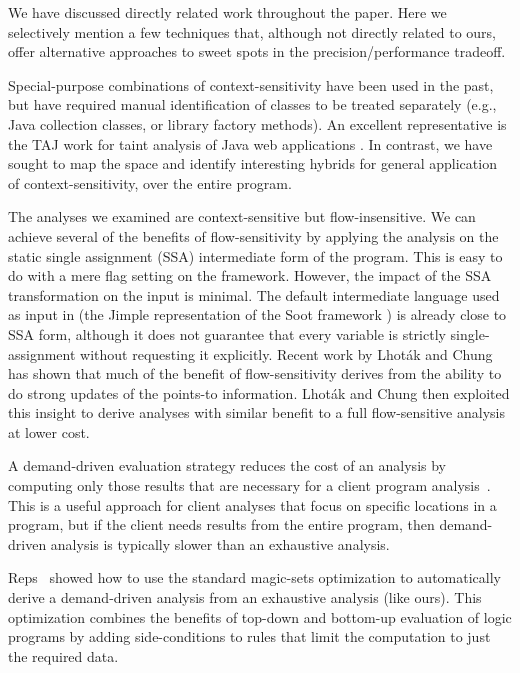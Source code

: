 We have discussed directly related work throughout the paper. Here we
selectively mention a few techniques that, although not directly
related to ours, offer alternative approaches to sweet spots in the
precision/performance tradeoff.

Special-purpose combinations of context-sensitivity have been used in
the past, but have required manual identification of classes to be
treated separately (e.g., Java collection classes, or library factory
methods). An excellent representative is the TAJ work for taint
analysis of Java web applications
\cite{Tripp:2009:TET:1542476.1542486}. In contrast, we have sought to
map the space and identify interesting hybrids for general application
of context-sensitivity, over the entire program.

The analyses we examined are context-sensitive but flow-insensitive.
We can achieve several of the benefits of flow-sensitivity by applying
the analysis on the static single assignment (SSA) intermediate form
of the program. This is easy to do with a mere flag setting on the
\doop{} framework. However, the impact of the SSA transformation
on the input is minimal. The default intermediate language used as
input in \doop{} (the Jimple representation of the Soot
framework \cite{vall99soot,valleerai00optimizing}) is already close to
SSA form, although it does not guarantee that every variable is
strictly single-assignment without requesting it explicitly.  Recent
work by Lhot\'{a}k and Chung \cite{Lhotak:2011:PAE} has shown that
much of the benefit of flow-sensitivity derives from the ability to do
strong updates of the points-to information. Lhot\'{a}k and Chung then
exploited this insight to derive analyses with similar benefit to a
full flow-sensitive analysis at lower cost.

A demand-driven evaluation strategy reduces the cost of an analysis by
computing only those results that are necessary for a client program
analysis~\cite{1094817,1134027,1328464,378802}. This is a useful
approach for client analyses that focus on specific locations in a
program, but if the client needs results from the entire program, then
demand-driven analysis is typically slower than an exhaustive
analysis.

Reps~\cite{727424} showed how to use the standard magic-sets
optimization to automatically derive a demand-driven analysis
from an exhaustive analysis (like ours). This optimization
combines the benefits of top-down and bottom-up evaluation of
logic programs by adding side-conditions to rules that limit
the computation to just the required data.

